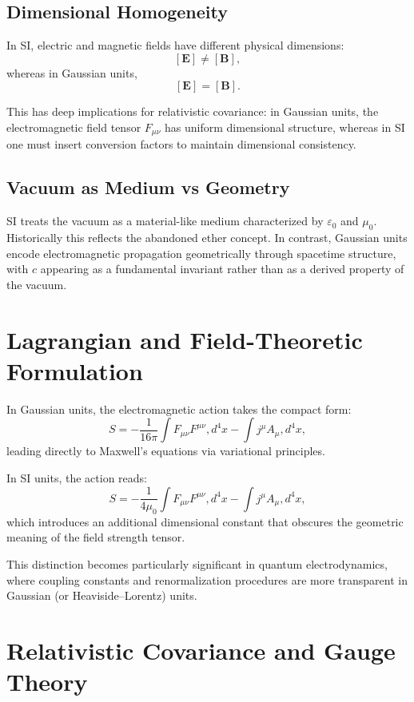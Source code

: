 \documentclass[12pt]{article}
\begin{document}
\subsection{Dimensional Homogeneity}

In SI, electric and magnetic fields have different physical dimensions:
\[
[\mathbf{E}] \neq [\mathbf{B}],
\]
whereas in Gaussian units,
\[
[\mathbf{E}] = [\mathbf{B}].
\]

This has deep implications for relativistic covariance: in Gaussian units, the electromagnetic field tensor $F_{\mu\nu}$ has uniform dimensional structure, whereas in SI one must insert conversion factors to maintain dimensional consistency.

\subsection{Vacuum as Medium vs Geometry}

SI treats the vacuum as a material-like medium characterized by $\varepsilon_0$ and $\mu_0$. Historically this reflects the abandoned ether concept. In contrast, Gaussian units encode electromagnetic propagation geometrically through spacetime structure, with $c$ appearing as a fundamental invariant rather than as a derived property of the vacuum.

\section{Lagrangian and Field-Theoretic Formulation}

In Gaussian units, the electromagnetic action takes the compact form:
\[
S = -\frac{1}{16\pi} \int F_{\mu\nu}F^{\mu\nu} , d^4x - \int j^\mu A_\mu , d^4x,
\]
leading directly to Maxwell’s equations via variational principles.

In SI units, the action reads:
\[
S = -\frac{1}{4\mu_0} \int F_{\mu\nu}F^{\mu\nu} , d^4x - \int j^\mu A_\mu , d^4x,
\]
which introduces an additional dimensional constant that obscures the geometric meaning of the field strength tensor.

This distinction becomes particularly significant in quantum electrodynamics, where coupling constants and renormalization procedures are more transparent in Gaussian (or Heaviside–Lorentz) units.

\section{Relativistic Covariance and Gauge Theory}
\end{document}
